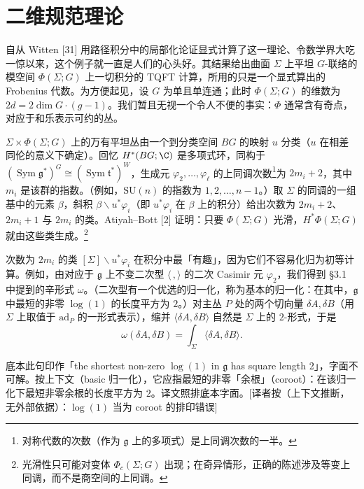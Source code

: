 
\section{二维规范理论}

自从 Witten [31] 用路径积分中的局部化论证显式计算了这一理论、令数学界大吃一惊以来，这个例子就一直是人们的心头好。其结果给出曲面 $\Sigma$ 上平坦 $G$-联络的模空间 $\Phi(\Sigma;G)$ 上一切积分的 TQFT 计算，所用的只是一个显式算出的Frobenius 代数。为方便起见，设 $G$ 为单且单连通；此时 $\Phi(\Sigma;G)$ 的维数为 $2d=2\dim G\cdot(g-1)$。我们暂且无视一个令人不便的事实：$\Phi$ 通常含有奇点，对应于和乐表示可约的丛。

$\Sigma\times\Phi(\Sigma;G)$ 上的万有平坦丛由一个到分类空间 $BG$ 的映射 $u$ 分类（$u$ 在相差同伦的意义下确定）。回忆 $H^*(BG;\C)$ 是多项式环，同构于 $(\operatorname{Sym}\mathfrak{g}^*)^G\cong(\operatorname{Sym}\mathfrak{t}^*)^W$，生成元 $\varphi_2,\dots,\varphi_\ell$ 的上同调次数\footnote{对称代数的次数（作为 $\mathfrak{g}$ 上的多项式）是上同调次数的一半。}为 $2m_i+2$，其中 $m_i$ 是该群的指数。（例如，$\mathrm{SU}(n)$ 的指数为 $1,2,\dots,n-1$。）取 $\Sigma$ 的同调的一组基中的元素 $\beta$，斜积 $\beta\backslash u^*\varphi_i$（即 $u^*\varphi_i$ 在 $\beta$ 上的积分）给出次数为 $2m_i+2$、$2m_i+1$ 与 $2m_i$ 的类。Atiyah--Bott [2] 证明：只要 $\Phi(\Sigma;G)$ 光滑，$H^*\Phi(\Sigma;G)$ 就由这些类生成。\footnote{光滑性只可能对变体 $\Phi_c(\Sigma;G)$ 出现；在奇异情形，正确的陈述涉及等变上同调，而不是商空间的上同调。}

次数为 $2m_i$ 的类 $[\Sigma]\backslash u^*\varphi_i$ 在积分中最「有趣」，因为它们不容易化归为初等计算。例如，由对应于 $\mathfrak{g}$ 上不变二次型 $\langle\,,\rangle$ 的二次 Casimir 元 $\varphi_2$，我们得到 §3.1 中提到的辛形式 $\omega$。（二次型有一个优选的归一化，称为基本的归一化：在其中，$\mathfrak{g}$ 中最短的非零 $\log(1)$ 的长度平方为 $2$。）对主丛 $P$ 处的两个切向量 $\delta A,\delta B$（用 $\Sigma$ 上取值于 $\mathrm{ad}_P$ 的一形式表示），缩并 $\langle\delta A,\delta B\rangle$ 自然是 $\Sigma$ 上的 $2$-形式，于是
\[
\omega(\delta A,\delta B)=\int_\Sigma\langle\delta A,\delta B\rangle.
\]

\begin{annote}
底本此句印作「the shortest non-zero $\log(1)$ in $\mathfrak{g}$ has square length 2」，字面不可解。按上下文（basic 归一化），它应指最短的非零「余根」（coroot）：在该归一化下最短非零余根的长度平方为 $2$。译文照排底本字面。[译者按（上下文推断，无外部依据）：$\log(1)$ 当为 coroot 的排印错误]
\end{annote}

